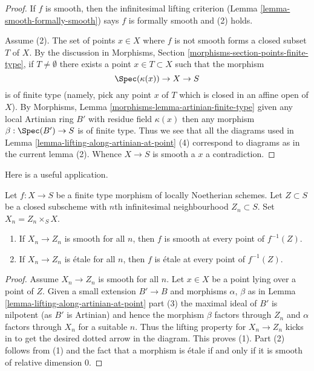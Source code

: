 \begin{proof}
If $f$ is smooth, then the infinitesimal lifting criterion
(Lemma \ref{lemma-smooth-formally-smooth}) says
$f$ is formally smooth and (2) holds.

\medskip\noindent
Assume (2). The set of points $x \in X$ where $f$ is not smooth
forms a closed subset $T$ of $X$. By the discussion in Morphisms,
Section \ref{morphisms-section-points-finite-type}, if $T \not = \emptyset$
there exists a point $x \in T \subset X$ such that the morphism
$$
\Spec(\kappa(x)) \to X \to S
$$
is of finite type (namely, pick any point $x$ of $T$ which is closed
in an affine open of $X$). By
Morphisms, Lemma \ref{morphisms-lemma-artinian-finite-type} given any
local Artinian ring $B'$ with residue field $\kappa(x)$ then any
morphism $\beta : \Spec(B') \to S$ is of finite type. Thus
we see that all the diagrams used in
Lemma \ref{lemma-lifting-along-artinian-at-point} (4) correspond
to diagrams as in the current lemma (2). Whence $X \to S$ is smooth
a $x$ a contradiction.
\end{proof}

\noindent
Here is a useful application.

\begin{lemma}
\label{lemma-check-smoothness-on-infinitesimal-nbhds}
Let $f : X \to S$ be a finite type morphism of locally Noetherian schemes.
Let $Z \subset S$ be a closed subscheme with $n$th infinitesimal
neighbourhood $Z_n \subset S$. Set $X_n = Z_n \times_S X$.
\begin{enumerate}
\item If $X_n \to Z_n$ is smooth for all $n$, then $f$
is smooth at every point of $f^{-1}(Z)$.
\item If $X_n \to Z_n$ is \'etale for all $n$, then $f$
is \'etale at every point of $f^{-1}(Z)$.
\end{enumerate}
\end{lemma}

\begin{proof}
Assume $X_n \to Z_n$ is smooth for all $n$.
Let $x \in X$ be a point lying over a point of $Z$.
Given a small extension $B' \to B$ and morphisms $\alpha$, $\beta$ as in
Lemma \ref{lemma-lifting-along-artinian-at-point} part (3)
the maximal ideal of $B'$ is nilpotent (as $B'$ is Artinian)
and hence the morphism $\beta$ factors through $Z_n$ and $\alpha$ factors
through $X_n$ for a suitable $n$. Thus the lifting property for
$X_n \to Z_n$ kicks in to get the desired dotted arrow in the diagram.
This proves (1). Part (2) follows from (1) and the fact that a morphism
is \'etale if and only if it is smooth of relative dimension $0$.
\end{proof}

